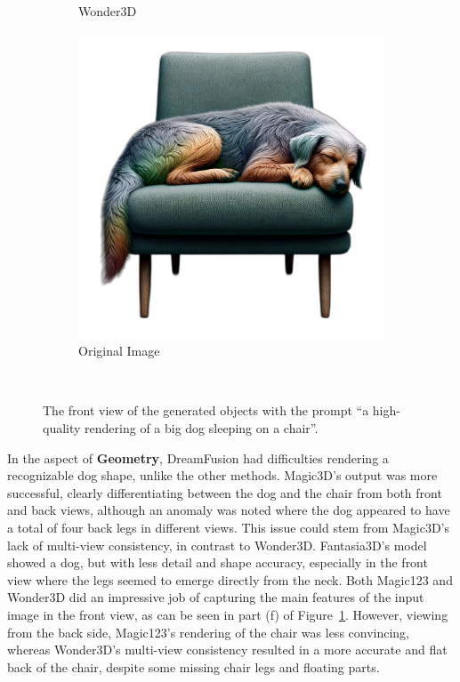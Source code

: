 \begin{figure}[ht]
\begin{subfigure}[b]{0.27\textwidth}
        \caption{Wonder3D}
        \vspace{0.1cm}
    \end{subfigure}
    \begin{subfigure}[b]{0.28\textwidth}
        \centering
        \includegraphics[width=\textwidth]{figures/input/dog.png}
        \caption{Original Image}
        \vspace{0.1cm}
    \end{subfigure}
    \caption{The front view of the generated objects with the prompt ``a high-quality rendering of a big dog sleeping on a chair''.}~\label{fig:resultDogFront}
\end{figure}

In the aspect of \textbf{Geometry}, DreamFusion had difficulties rendering a recognizable dog shape, unlike the other methods. Magic3D's output was more successful, clearly differentiating between the dog and the chair from both front and back views, although an anomaly was noted where the dog appeared to have a total of four back legs in different views. This issue could stem from Magic3D's lack of multi-view consistency, in contrast to Wonder3D. Fantasia3D's model showed a dog, but with less detail and shape accuracy, especially in the front view where the legs seemed to emerge directly from the neck. Both Magic123 and Wonder3D did an impressive job of capturing the main features of the input image in the front view, as can be seen in part (f) of Figure~\ref{fig:resultDogFront}. However, viewing from the back side, Magic123's rendering of the chair was less convincing, whereas Wonder3D's multi-view consistency resulted in a more accurate and flat back of the chair, despite some missing chair legs and floating parts.\\

